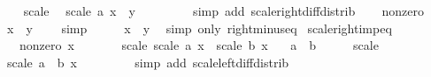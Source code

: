 \begin{isabellebody}
\ \ \isamarkupfalse%
\ scale\ \isamarkupfalse%
\ {\isachardoublequoteopen}scale\ a\ {\isacharparenleft}{\kern0pt}x\ {\isacharminus}{\kern0pt}\ y{\isacharparenright}{\kern0pt}\ {\isacharequal}{\kern0pt}\ {}{\isachardoublequoteclose}\isanewline
\ \ \ \ \ \isamarkupfalse%
\ {\isacharparenleft}{\kern0pt}simp\ add{\isacharcolon}{\kern0pt}\ scale{\isacharunderscore}{\kern0pt}right{\isacharunderscore}{\kern0pt}diff{\isacharunderscore}{\kern0pt}distrib{\isacharparenright}{\kern0pt}\isanewline
\ \ \isamarkupfalse%
\ nonzero\ \isamarkupfalse%
\ {\isachardoublequoteopen}x\ {\isacharminus}{\kern0pt}\ y\ {\isacharequal}{\kern0pt}\ {}{\isachardoublequoteclose}\ \isamarkupfalse%
\ simp\isanewline
\ \ \isamarkupfalse%
\ \isamarkupfalse%
\ {\isachardoublequoteopen}x\ {\isacharequal}{\kern0pt}\ y{\isachardoublequoteclose}\ \isamarkupfalse%
\ {\isacharparenleft}{\kern0pt}simp\ only{\isacharcolon}{\kern0pt}\ right{\isacharunderscore}{\kern0pt}minus{\isacharunderscore}{\kern0pt}eq{\isacharparenright}{\kern0pt}\isanewline
{}\isamarkupfalse%
%
\endisatagproof
{\isafoldproof}%
%
\isadelimproof
\isanewline
%
\endisadelimproof
\isanewline
{}\isamarkupfalse%
\ scale{\isacharunderscore}{\kern0pt}right{\isacharunderscore}{\kern0pt}imp{\isacharunderscore}{\kern0pt}eq{\isacharcolon}{\kern0pt}\isanewline
\ \ \ nonzero{\isacharcolon}{\kern0pt}\ {\isachardoublequoteopen}x\ {\isasymnoteq}\ {}{\isachardoublequoteclose}\isanewline
\ \ \ \ \ scale{\isacharcolon}{\kern0pt}\ {\isachardoublequoteopen}scale\ a\ x\ {\isacharequal}{\kern0pt}\ scale\ b\ x{\isachardoublequoteclose}\isanewline
\ \ \ {\isachardoublequoteopen}a\ {\isacharequal}{\kern0pt}\ b{\isachardoublequoteclose}\isanewline
%
\isadelimproof
%
\endisadelimproof
%
\isatagproof
{}\isamarkupfalse%
\ {\isacharminus}{\kern0pt}\isanewline
\ \ \isamarkupfalse%
\ scale\ \isamarkupfalse%
\ {\isachardoublequoteopen}scale\ {\isacharparenleft}{\kern0pt}a\ {\isacharminus}{\kern0pt}\ b{\isacharparenright}{\kern0pt}\ x\ {\isacharequal}{\kern0pt}\ {}{\isachardoublequoteclose}\isanewline
\ \ \ \ \ \isamarkupfalse%
\ {\isacharparenleft}{\kern0pt}simp\ add{\isacharcolon}{\kern0pt}\ scale{\isacharunderscore}{\kern0pt}left{\isacharunderscore}{\kern0pt}diff{\isacharunderscore}{\kern0pt}distrib{\isacharparenright}{\kern0pt}\isanewline

\end{isabellebody}
